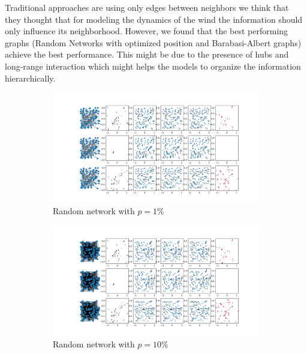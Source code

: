 \documentclass[a4paper,10pt]{article}
\begin{document}
Traditional approaches are using only edges between neighbors we think that they thought that for modeling the dynamics of the wind the information should only influence its neighborhood. However, we found that the best performing graphs (Random Networks with optimized position and Barabasi-Albert graphs) achieve the best performance. This might be due to the presence of hubs and long-range interaction which might helps the models to organize the information hierarchically.


\begin{figure}[htbp]
  \begin{subfigure}{0.24\textwidth}
    \centering
    \includegraphics[trim={0 13.2cm 29.35cm 0},clip,width=\textwidth]{../results/pdfs/rn1-100N-noemb-fixed}
    \caption{Random network with $p=1\%$}
  \end{subfigure}
  \begin{subfigure}{0.24\textwidth}
    \centering
    \includegraphics[trim={0 13.2cm 29.35cm 0},clip,width=\textwidth]{../results/pdfs/rn10-100N-noemb-fixed}
    \caption{Random network with $p=10\%$}
  \end{subfigure}
  \begin{subfigure}{0.24\textwidth}

\end{subfigure}
\end{figure}
\end{document}

